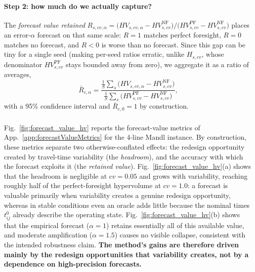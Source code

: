 \documentclass[a4paper,fleqn]{cas-sc}
\begin{document}
\paragraph{Step 2: how much do we actually capture?} The \emph{forecast value retained} $R_{s,\textit{cv},\alpha}=\bigl(HV_{s,\textit{cv},\alpha}-HV^{\mathrm{NF}}_{s,\textit{cv}}\bigr)/\bigl(HV^{\mathrm{PF}}_{s,\textit{cv}}-HV^{\mathrm{NF}}_{s,\textit{cv}}\bigr)$ places an error-$\alpha$ forecast on that same scale: $R=1$ matches perfect foresight, $R=0$ matches no forecast, and $R<0$ is worse than no forecast. Since this gap can be tiny for a single seed (making per-seed ratios erratic, unlike $H_{s,\textit{cv}}$, whose denominator $HV^{\mathrm{PF}}_{s,\textit{cv}}$ stays bounded away from zero), we aggregate it as a ratio of averages,
\begin{equation}
\bar R_{c,\alpha}=\frac{\tfrac1S\sum_s\big(HV_{s,\textit{cv},\alpha}-HV^{\mathrm{NF}}_{s,\textit{cv}}\big)}{\tfrac1S\sum_s\big(HV^{\mathrm{PF}}_{s,\textit{cv}}-HV^{\mathrm{NF}}_{s,\textit{cv}}\big)},
\end{equation}
with a 95\% confidence interval and $\bar R_{c,0}=1$ by construction. 

\subsubsection{}\label{app:forecast_sensitivity}

 Fig.~\ref{fig:forecast_value_hv} reports the forecast-value metrics of App.~\ref{app:forecastValueMetrics} for the 4-line Mandl instance. By construction, these metrics separate two otherwise-conflated effects: the redesign opportunity created by travel-time variability (the \emph{headroom}), and the accuracy with which the forecast exploits it (the \emph{retained value}). Fig.~\ref{fig:forecast_value_hv}(a) shows that the headroom is negligible at $cv=0.05$ and grows with variability, reaching roughly half of the perfect-foresight hypervolume at $cv=1.0$: a forecast is valuable primarily when variability creates a genuine redesign opportunity, whereas in stable conditions even an oracle adds little because the nominal times $t_{ij}^{0}$ already describe the operating state. Fig.~\ref{fig:forecast_value_hv}(b) shows that the empirical forecast ($\alpha=1$) retains essentially all of this available value, and moderate amplification ($\alpha=1.5$) causes no visible collapse, consistent with the intended robustness claim. \textbf{The method's gains are therefore driven mainly by the redesign opportunities that variability creates, not by a dependence on high-precision forecasts.}
\end{document}
